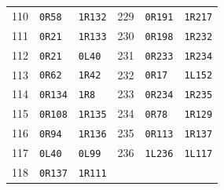 \begin{longtable}{rll@{\qquad}rll}
110 & \texttt{0R58} & \texttt{1R132} & 229 & \texttt{0R191} & \texttt{1R217}\\
111 & \texttt{0R21} & \texttt{1R133} & 230 & \texttt{0R198} & \texttt{1R232}\\
112 & \texttt{0R21} & \texttt{0L40} & 231 & \texttt{0R233} & \texttt{1R234}\\
113 & \texttt{0R62} & \texttt{1R42} & 232 & \texttt{0R17} & \texttt{1L152}\\
114 & \texttt{0R134} & \texttt{1R8} & 233 & \texttt{0R234} & \texttt{1R235}\\
115 & \texttt{0R108} & \texttt{1R135} & 234 & \texttt{0R78} & \texttt{1R129}\\
116 & \texttt{0R94} & \texttt{1R136} & 235 & \texttt{0R113} & \texttt{1R137}\\
117 & \texttt{0L40} & \texttt{0L99} & 236 & \texttt{1L236} & \texttt{1L117}\\
118 & \texttt{0R137} & \texttt{1R111} & & &\\
\end{longtable}\endgroup
